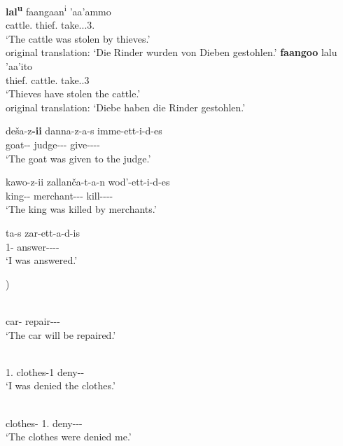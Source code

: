 \enlargethispage{2\baselineskip}
\begin{exe}\ex\label{KabPass2}
\begin{xlist}
\ex\gll \textbf{lal\textsuperscript{u}} faangaan\textsuperscript{i} 'aa'ammo\\
cattle.\nom{} thief.\loc{} take.\pass{}.\pfv{}.3\sg{}.\mas{}\\
\glt `The cattle was stolen by thieves.'\\
\glt original translation: `Die Rinder wurden von Dieben gestohlen.'
\ex\gll \textbf{faangoo} lalu 'aa'ito\\
thief.\nom{} cattle.\acc{} take.\pfv{}.3\pl{}\\
\glt`Thieves have stolen the cattle.'\\
\glt original translation: `Diebe haben die Rinder gestohlen.'
\end{xlist}
\end{exe}

\begin{exe}\ex\label{GamPass} 
\begin{xlist}
\ex\gll de\v sa-z\textbf{-ii} danna-z-a-s imme-ett-i-d-es\\
goat--\nom{} judge--\gen{}-\Recip{} give-\pass{}-\persm-\tns{}-\complx{}\\
\glt `The goat was given to the judge.' 

\ex\gll kawo-z-ii zall\textglotstop an\v ca-t-a-n wod'-ett-i-d-es\\
king--\nom{} merchant-\pl{}-\acc{}-\loc{} kill-\pass{}-\persm-\tns{}-\complx{} \\
\glt`The king was killed by merchants.' %

\ex \gll ta-s zar-ett-a-d-is\\
1\sg{}-\Recip{} answer-\pass{}-\persm-\tns{}-\complx{}\\
\glt`I was answered.'
\end{xlist}
\end{exe}

\begin{exe}\ex\label{HarPass}){}{\citealp[172, 173]{Owens:1985}}
\begin{xlist}
\ex\gll{}  \\
car-\nom{} \foc{} repair-\pass{}-\fem{}-\ipfv{}\\
\glt `The car will be repaired.'  

\ex\gll{}  \\
1\sg{}.\nom{} clothes-1\sg{} deny-\pass{}-\pst{}\\
\glt `I was denied the clothes.'

\ex\gll{}  \\
clothes-\nom{} 1\sg{}.\acc{} deny-\pass{}-\fem{}-\pst{}\\
\glt `The clothes were denied me.' 
\end{xlist} 
\end{exe}

